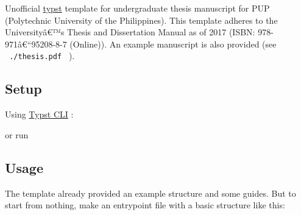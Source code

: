 \label{readme}
Unofficial \href{https://typst.app/}{typst} template for undergraduate
thesis manuscript for PUP (Polytechnic University of the Philippines).
This template adheres to the Universityâ€™s Thesis and Dissertation
Manual as of 2017 (ISBN: 978-971â€``95208-8-7 (Online)). An example
manuscript is also provided (see \texttt{\ ./thesis.pdf\ } ).

\subsection{Setup}\label{setup}

Using
\href{https://github.com/typst/typst?tab=readme-ov-file\#installation}{Typst
CLI} :

\begin{Shaded}
\begin{Highlighting}[]
\end{Highlighting}
\end{Shaded}

or run

\begin{Shaded}
\begin{Highlighting}[]
\end{Highlighting}
\end{Shaded}

\subsection{Usage}\label{usage}

The template already provided an example structure and some guides. But
to start from nothing, make an entrypoint file with a basic structure
like this:

